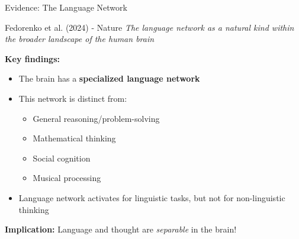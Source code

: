 \documentclass[aspectratio=169]{beamer}
\begin{document}
\begin{frame}[shrink=10]{Evidence: The Language Network 🧠}
\small
\begin{block}{Fedorenko et al. (2024) - Nature}
\textit{The language network as a natural kind within the broader landscape of the human brain}
\end{block}

\vspace{0.2cm}

\textbf{Key findings:}
\begin{itemize}\setlength{\itemsep}{0pt}\setlength{\itemsep}{0pt}
    \item The brain has a \textbf{specialized language network}
    \item This network is distinct from:
    \begin{itemize}\setlength{\itemsep}{0pt}\setlength{\itemsep}{0pt}
        \item General reasoning/problem-solving
        \item Mathematical thinking
        \item Social cognition
        \item Musical processing
    \end{itemize}
    \item Language network activates for linguistic tasks, but not for non-linguistic thinking
\end{itemize}

\vspace{0.2cm}

\textbf{Implication:} Language and thought are \textit{separable} in the brain!
\end{frame}
\end{document}
